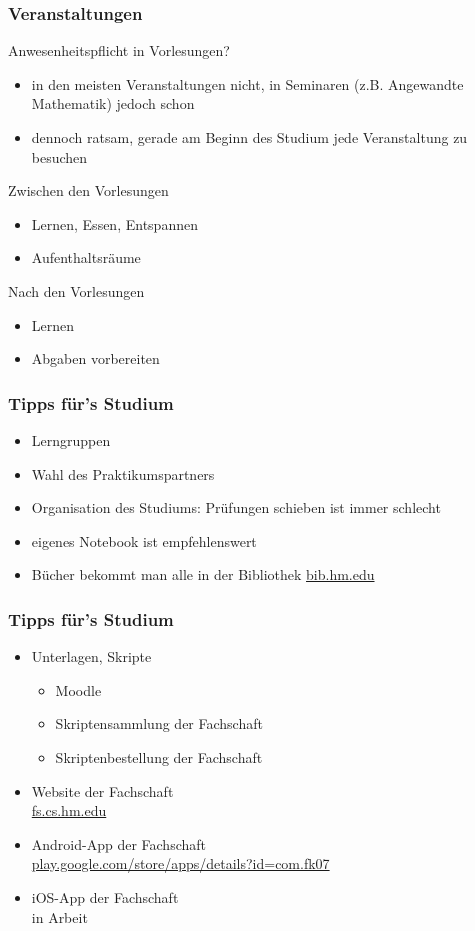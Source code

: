 \documentclass{beamer}
\begin{document}
	\begin{frame}
		\frametitle{Veranstaltungen}
		Anwesenheitspflicht in Vorlesungen?
		\begin{itemize}
			\item in den meisten Veranstaltungen nicht, in Seminaren (z.B. Angewandte Mathematik) jedoch schon
			\item dennoch ratsam, gerade am Beginn des Studium jede Veranstaltung zu besuchen
		\end{itemize}
		\bigskip
		\pause
		Zwischen den Vorlesungen
		\begin{itemize}
			\item Lernen, Essen, Entspannen
			\item Aufenthaltsräume
		\end{itemize}
		\bigskip
		\pause
		Nach den Vorlesungen
		\begin{itemize}
			\item Lernen
			\item Abgaben vorbereiten
		\end{itemize}
		
	\end{frame}
	
	\begin{frame}[t]
		\frametitle{Tipps für's Studium}
		\begin{itemize}
			\item Lerngruppen
			\pause
			\item Wahl des Praktikumspartners
			\pause
			\item Organisation des Studiums: Prüfungen schieben ist immer schlecht
			\pause
			\item eigenes Notebook ist empfehlenswert
			\pause
			\item Bücher bekommt man alle in der Bibliothek \url{bib.hm.edu}
		\end{itemize}
	\end{frame}
	
	\begin{frame}[t]
		\frametitle{Tipps für's Studium}
		\begin{itemize}
			\item Unterlagen, Skripte 
			\begin{itemize}
				\item Moodle
				\item Skriptensammlung der Fachschaft
				\item Skriptenbestellung der Fachschaft
			\end{itemize}
			\pause
			\item Website der Fachschaft\\ \url{fs.cs.hm.edu}
			\pause
			\item Android-App der Fachschaft\\ \url{play.google.com/store/apps/details?id=com.fk07}
			\pause
			\item iOS-App der Fachschaft\\
			in Arbeit	
		\end{itemize}
	\end{frame}
	
\end{document}

